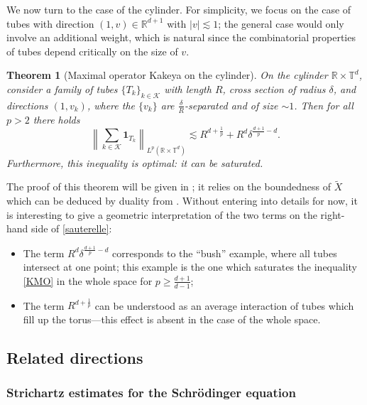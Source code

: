 \documentclass[11pt,a4paper,reqno]{amsart}
\theoremstyle{plain}
\newtheorem{theorem}{Theorem}[section]
\theoremstyle{remark}
\begin{document}
We now turn to the case of the cylinder. For simplicity, we focus on the case of tubes with direction $(1,v) \in \mathbb{R}^{d+1}$ with $|v| \lesssim 1$; the general case would only involve an additional weight, which is natural since the combinatorial properties of tubes depend critically on the size of $v$.

\begin{theorem}[Maximal operator Kakeya on the cylinder] \label{thm.Kakeya}
On the cylinder $\mathbb{R}\times \mathbb{T}^d$, consider a family of tubes $\{T_k\}_{k\in \mathcal{K}}$ with length $R$, cross section of radius $\delta$, and directions $(1,v_k)$, where the $\{v_k\}$ are $\frac{\delta}{R}$-separated and of size $\sim 1$. Then for all $p>2$ there holds
\begin{equation}
\label{sauterelle}
    \left\| \sum_{k\in\mathcal{K}}\mathbf{1}_{T_k} \right\|_{L^p(\mathbb{R}\times \mathbb{T}^{d})} \lesssim R^{d+\frac{1}{p}} + R^d \delta^{\frac{d+1}{p}-d}.
\end{equation}
Furthermore, this inequality is optimal: it can be saturated.
\end{theorem}

The proof of this theorem will be given in ; it relies on the boundedness of $\widetilde{X}$ which can be deduced by duality from . Without entering into details for now, it is interesting to give a geometric interpretation of the two terms on the right-hand side of \eqref{sauterelle}:
\begin{itemize}
    \item The term $R^d \delta^{\frac{d+1}{p}-d}$ corresponds to the  ``bush'' example, where all tubes intersect at one point; this example is the one which saturates the inequality \eqref{KMO} in the whole space for $p \geq \frac{d+1}{d-1}$;
    \item The term $R^{d+\frac{1}{p}}$ can be understood as an average interaction of tubes which fill up the torus---this effect is absent in the case of the whole space.
\end{itemize}

\subsection{Related directions} 

\subsubsection{Strichartz estimates for the Schr\"odinger equation} 
\end{document}
